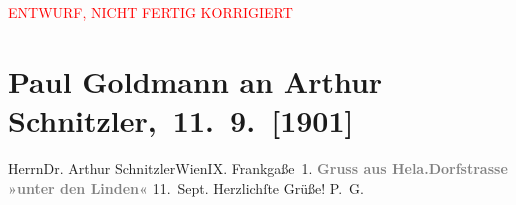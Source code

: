 
\begin{center}
            \textcolor{red}{ENTWURF, NICHT FERTIG KORRIGIERT}
                      \end{center}
            
         \renewcommand{\erwaehnteOrte}{Orte: Frankgasse, Hel, Wiejlska, Wien}
         \renewcommand{\erwaehnteWerke}{}
               \section[ Paul Goldmann an Arthur Schnitzler, 11. 9. {[}1901{]}]{ Paul Goldmann an Arthur Schnitzler, 11. 9. {[}1901{]}}\nopagebreak{}\rehead{ }\begin{ledgroupsized}[t]{13cm}\normalsize\beginnumbering \toendnotes[C]{\smallbreak\pagebreak[2]} 
\pstart{}{\pb}Herrn\pend{}\pstart{}Dr. Arthur Schnitzler\pend{}\pstart{}Wien\pend{}\pstart{}IX. Frankgaße 1.\pend{}{\bigskip}\pstart
           \noindent{}{\pb}\textcolor{gray}{\textbf{Gruss aus Hela.}}\hfill \textcolor{gray}{\textbf{Dorfstrasse »unter den Linden«}}\pend
           \pstart
           \centering{}11. Sept.\pend
           \pstart
           Herzlichſte Grüße! \spacefill\mbox{P. G.}\pend
           
         
         \endnumbering{}\end{ledgroupsized}  \newcommand{\dateiname}{L03082}\newcommand{\titel}{Paul Goldmann an Arthur Schnitzler, 11. 9. [1901]}\newcommand{\editorInnen}{Martin Anton Müller und Laura Untner}
      